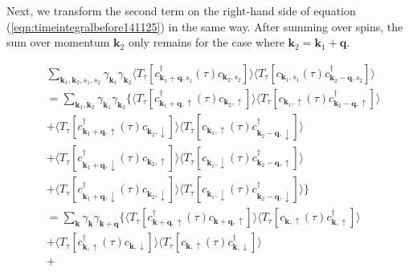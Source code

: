 \documentclass[a4j]{jsarticle}
\begin{document}
Next, we transform the second term on the right-hand side of equation (\ref{eqn:timeintegralbefore141125}) in the same way.
After summing over spins, the sum over momentum $\bm{k}_{2}$ only remains for the case where $\bm{k}_{2} = \bm{k}_{1} + \bm{q}$.

\begin{align}
	 &
	\sum_{\bm{k}_{1} , \bm{k}_{2} , s_{1} ,s_{2} }
	\gamma_{\bm{k}_{1}}
	\gamma_{\bm{k}_{2}}
	\langle T_{\tau} [
			c_{ \bm{k}_{1}+\bm{q} , s_{1} }^{\dagger} (\tau)
			c_{ \bm{k}_{2} , s_{2} }
		] \rangle
	\langle T_{\tau} [
			c_{ \bm{k}_{1} , s_{1} } (\tau)
			c_{ \bm{k}_{2}-\bm{q} , s_{2} }^{\dagger}
		] \rangle
	\\ &=
	\sum_{\bm{k}_{1} , \bm{k}_{2} }
	\gamma_{\bm{k}_{1}}
	\gamma_{\bm{k}_{2}}
	\Big\{
	\langle T_{\tau} [
			c_{ \bm{k}_{1}+\bm{q} , \uparrow }^{\dagger} (\tau)
			c_{ \bm{k}_{2} , \uparrow }
		] \rangle
	\langle T_{\tau} [
			c_{ \bm{k}_{1} , \uparrow } (\tau)
			c_{ \bm{k}_{2}-\bm{q} , \uparrow }^{\dagger}
		] \rangle
	\nonumber \\[2mm] &+
	\langle T_{\tau} [
			c_{ \bm{k}_{1}+\bm{q} , \uparrow }^{\dagger} (\tau)
			c_{ \bm{k}_{2} , \downarrow }
		] \rangle
	\langle T_{\tau} [
			c_{ \bm{k}_{1} , \uparrow } (\tau)
			c_{ \bm{k}_{2}-\bm{q} , \downarrow }^{\dagger}
		] \rangle
	\nonumber \\[2mm] &+
	\langle T_{\tau} [
			c_{ \bm{k}_{1}+\bm{q} , \downarrow }^{\dagger} (\tau)
			c_{ \bm{k}_{2} , \uparrow }
		] \rangle
	\langle T_{\tau} [
			c_{ \bm{k}_{1} , \downarrow } (\tau)
			c_{ \bm{k}_{2}-\bm{q} , \uparrow }^{\dagger}
		] \rangle
	\nonumber \\[2mm] &+
	\langle T_{\tau} [
			c_{ \bm{k}_{1}+\bm{q} , \downarrow }^{\dagger} (\tau)
			c_{ \bm{k}_{2} , \downarrow }
		] \rangle
	\langle T_{\tau} [
			c_{ \bm{k}_{1} , \downarrow } (\tau)
			c_{ \bm{k}_{2}-\bm{q} , \downarrow }^{\dagger}
		] \rangle
	\Big\}
	\nonumber \\[3mm]
	 & =
	\sum_{ \bm{k} }
	\gamma_{\bm{k}}
	\gamma_{\bm{k}+\bm{q}}
	\Big\{
	\langle T_{\tau} [
			c_{ \bm{k}+\bm{q} , \uparrow }^{\dagger} (\tau)
			c_{ \bm{k}+\bm{q} , \uparrow }
		] \rangle
	\langle T_{\tau} [
			c_{ \bm{k} , \uparrow } (\tau)
			c_{ \bm{k} , \uparrow }^{\dagger}
		] \rangle
	\nonumber \\[2mm] &+
	\langle T_{\tau} [
			c_{ \bm{k} , \uparrow }^{\dagger} (\tau)
			c_{ \bm{k} , \downarrow }
		] \rangle
	\langle T_{\tau} [
			c_{ \bm{k} , \uparrow } (\tau)
			c_{ \bm{k} , \downarrow }^{\dagger}
		] \rangle
	\nonumber \\[2mm] &+

\end{align}
\end{document}
